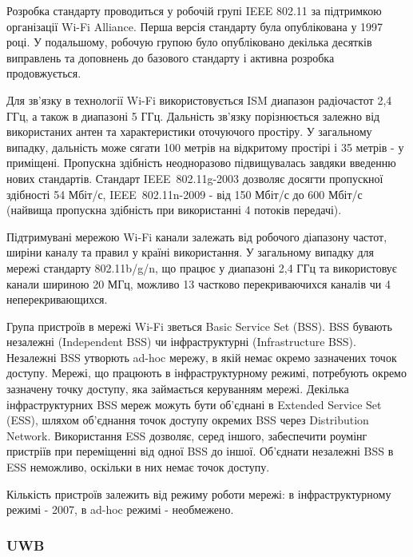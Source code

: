 \documentclass[a4paper,ukrainian,utf8,nocolumnsxix,floatsection,equationsection]{eskdtext}
\renewcommand\paragraph{\subsubsection}
\newcommand{\todoi}[1]{\todo[inline]{#1}}
\newcommand{\engtxt}[1]{\foreignlanguage{english}{#1}}
\begin{document}
Розробка стандарту проводиться у робочій групі IEEE 802.11 за підтримкою організації Wi-Fi Alliance. Перша версія стандарту була опублікована у 1997 році. У подальшому, робочую групою було опубліковано декілька десятків виправлень та доповнень до базового стандарту і активна розробка продовжується.

Для зв’язку в технології Wi-Fi використовується ISM диапазон радіочастот 2,4 ГГц, а також в диапазоні 5 ГГц. Дальність зв’язку порізнюється залежно від використаних антен та характеристики оточуючого простіру. У загальному випадку, дальність може сягати 100 метрів на відкритому простірі і 35 метрів - у приміщені. Пропускна здібність неодноразово підвищувалась завдяки введенню нових стандартів. Стандарт IEEE~802.11g-2003 дозволяє досягти пропускної здібності 54 Мбіт/с, IEEE~802.11n-2009 - від 150 Мбіт/с до 600 Мбіт/с (найвища пропускна здібність при використанні 4 потоків передачі). 

Підтримувані мережою Wi-Fi канали залежать від робочого діапазону частот, ширіни каналу та правил у країні використання. У загальному випадку для мережі стандарту 802.11b/g/n, що працює у диапазоні 2,4 ГГц та використовує канали шириною 20 МГц, можливо 13 частково перекриваючихся каналів чи 4 неперекривающихся. 

\todoi{image channels}

Група пристроїв в мережі Wi-Fi зветься \engtxt{Basic Service Set} (BSS). BSS бувають незалежні (\engtxt{Independent BSS}) чи інфраструктурні (\engtxt{Infrastructure BSS}). Незалежні BSS утворють ad-hoc мережу, в якій немає окремо зазначених точок доступу. Мережі, що працюють в інфраструктурному режимі, потребують окремо зазначену точку доступу, яка займається керуванням мережі. Декілька інфраструктурних BSS мереж можуть бути об’єднані в \engtxt{Extended Service Set} (ESS), шляхом об’єднання точок доступу окремих BSS через \engtxt{Distribution Network}. Використання ESS дозволяє, серед іншого, забеспечити роумінг пристріїв при переміщенні від одної BSS до іншої. Об’єднати незалежні BSS в ESS неможливо, оскільки в них немає точок доступу.

Кількість пристроїв залежить від режиму роботи мережі: в інфраструктурному режимі - 2007, в ad-hoc режимі - необмежено.


\paragraph{UWB} %
\label{par:uwb}
\end{document}
